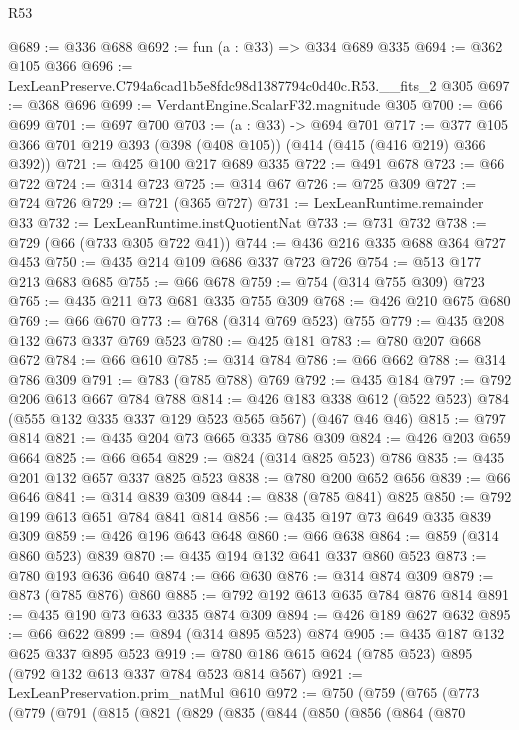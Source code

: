 \begin{lexlean}{R53}
\begin{coremodule}
@689 := @336 @688
@692 := fun (a : @33) => @334 @689 @335
@694 := @362 @105 @366
@696 := LexLeanPreserve.C794a6cad1b5e8fdc98d1387794c0d40c.R53.__fits_2 @305
@697 := @368 @696
@699 := VerdantEngine.ScalarF32.magnitude @305
@700 := @66 @699
@701 := @697 @700
@703 := (a : @33) -> @694 @701
@717 := @377 @105 @366 @701 @219 @393 (@398 (@408 @105)) (@414 (@415 (@416 @219) @366 @392))
@721 := @425 @100 @217 @689 @335
@722 := @491 @678
@723 := @66 @722
@724 := @314 @723
@725 := @314 @67
@726 := @725 @309
@727 := @724 @726
@729 := @721 (@365 @727)
@731 := LexLeanRuntime.remainder @33
@732 := LexLeanRuntime.instQuotientNat
@733 := @731 @732
@738 := @729 (@66 (@733 @305 @722 @41))
@744 := @436 @216 @335 @688 @364 @727 @453
@750 := @435 @214 @109 @686 @337 @723 @726
@754 := @513 @177 @213 @683 @685
@755 := @66 @678
@759 := @754 (@314 @755 @309) @723
@765 := @435 @211 @73 @681 @335 @755 @309
@768 := @426 @210 @675 @680
@769 := @66 @670
@773 := @768 (@314 @769 @523) @755
@779 := @435 @208 @132 @673 @337 @769 @523
@780 := @425 @181
@783 := @780 @207 @668 @672
@784 := @66 @610
@785 := @314 @784
@786 := @66 @662
@788 := @314 @786 @309
@791 := @783 (@785 @788) @769
@792 := @435 @184
@797 := @792 @206 @613 @667 @784 @788
@814 := @426
    @183
    @338
    @612
    (@522 @523)
    @784
    (@555 @132 @335 @337 @129 @523 @565 @567)
    (@467 @46 @46)
@815 := @797 @814
@821 := @435 @204 @73 @665 @335 @786 @309
@824 := @426 @203 @659 @664
@825 := @66 @654
@829 := @824 (@314 @825 @523) @786
@835 := @435 @201 @132 @657 @337 @825 @523
@838 := @780 @200 @652 @656
@839 := @66 @646
@841 := @314 @839 @309
@844 := @838 (@785 @841) @825
@850 := @792 @199 @613 @651 @784 @841 @814
@856 := @435 @197 @73 @649 @335 @839 @309
@859 := @426 @196 @643 @648
@860 := @66 @638
@864 := @859 (@314 @860 @523) @839
@870 := @435 @194 @132 @641 @337 @860 @523
@873 := @780 @193 @636 @640
@874 := @66 @630
@876 := @314 @874 @309
@879 := @873 (@785 @876) @860
@885 := @792 @192 @613 @635 @784 @876 @814
@891 := @435 @190 @73 @633 @335 @874 @309
@894 := @426 @189 @627 @632
@895 := @66 @622
@899 := @894 (@314 @895 @523) @874
@905 := @435 @187 @132 @625 @337 @895 @523
@919 := @780 @186 @615 @624 (@785 @523) @895 (@792 @132 @613 @337 @784 @523 @814 @567)
@921 := LexLeanPreservation.prim_natMul @610
@972 := @750
    (@759
      (@765
        (@773
          (@779
            (@791
              (@815
                (@821
                  (@829
                    (@835
                      (@844
                        (@850
                          (@856
                            (@864
                              (@870

\end{coremodule}
\end{lexlean}
